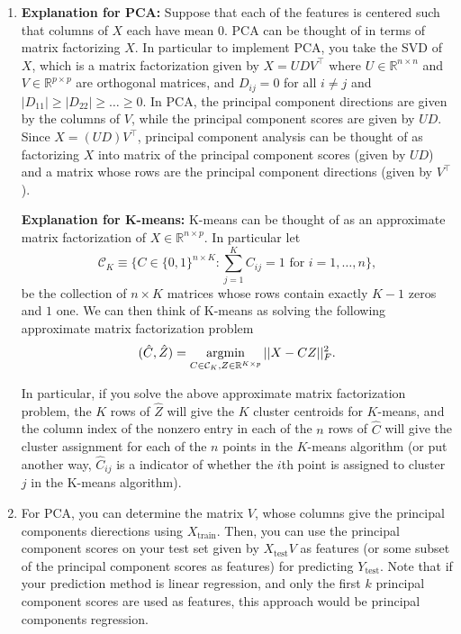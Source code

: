\begin{enumerate}[label=(\alph*)]

\item
\textbf{Explanation for PCA:} Suppose that each of the features is centered such that columns of $X$ each have mean $0$. PCA can be thought of in terms of matrix factorizing $X$. In particular to implement PCA, you take the SVD of $X$, which is a matrix factorization given by $X=UDV^\top  $ where $U \in \mathbb{R}^{n \times n}$ and $V \in \mathbb{R}^{p \times p}$ are orthogonal matrices, and $D_{ij} = 0$ for all $i \neq j$ and $\vert D_{11} \vert \geq \vert D_{22} \vert \geq \dots \geq 0$. In PCA, the principal component directions are given by the columns of $V$, while the principal component scores are given by $UD$. Since $X=(UD) V^\top  $, principal component analysis can be thought of as factorizing $X$ into matrix of the principal component scores (given by $UD$) and a matrix whose rows are the principal component directions (given by $V^\top  $).

\textbf{Explanation for K-means:} K-means can be thought of as an approximate matrix factorization of $X \in \mathbb{R}^{n \times p}$. In particular let 
\[ 
    \mathcal{C}_K \equiv \Bigr\{ C \in \{0,1\}^{n\times K} :  \sum_{j=1}^{K}C_{ij} =1 \text{ for } i=1,\ldots,n\Bigr\},
\]
be the collection of $n \times K$ matrices whose rows contain exactly $K-1$ zeros and $1$ one. We can then think of K-means as solving the following approximate matrix factorization problem $$(\hat{C}, \hat{Z} ) = \operatorname*{argmin}\limits_{C \in \mathcal{C}_K , Z \in \mathbb{R}^{K \times p} } \vert \vert X - CZ \vert \vert_F^2.$$

In particular, if you solve the above approximate matrix factorization problem, the $K$ rows of $\hat{Z}$ will give the $K$ cluster centroids for $K$-means, and the column index of the nonzero entry in each of the $n$ rows of $\hat{C}$ will give the cluster assignment for each of the $n$ points in the $K$-means algorithm (or put another way, $\hat{C}_{ij}$ is a indicator of whether the $i$th point is assigned to cluster $j$ in the K-means algorithm).

\item For PCA, you can determine the matrix $V$, whose columns give the principal components dierections using $X_{\text{train}}$. Then, you can use the principal component scores on your test set given by $X_{\text{test}} V$ as features (or some subset of the principal component scores as features) for predicting $Y_{\text{test}}$. Note that if your prediction method is linear regression, and only the first $k$ principal component scores are used as features, this approach would be principal components regression.


\end{enumerate}
